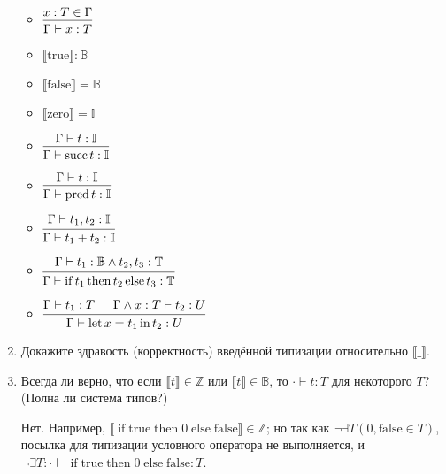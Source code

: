 \documentclass{article}
\DeclareMathOperator{\tsucc}{succ}
\DeclareMathOperator{\tpred}{pred}
\DeclareMathOperator{\tlet}{let}
\DeclareMathOperator{\tin}{in}
\DeclareMathOperator{\tthen}{then}
\DeclareMathOperator{\telse}{else}
\DeclareMathOperator{\tif}{if}
\begin{document}
\begin{enumerate}
        \begin{itemize}
            \item $
                \begin{prooftree}
                    \hypo{x:T\in\Gamma}
                    \infer 1{\Gamma\vdash x:T}
                \end{prooftree}
            $
            \item $\llbracket\mathrm{true}\rrbracket : \mathbb{B}$
            \item $\llbracket\mathrm{false}\rrbracket = \mathbb{B}$
            \item $\llbracket\mathrm{zero}\rrbracket = \mathbb{I}$    
            \item $
                \begin{prooftree}
                    \hypo{\Gamma\vdash t:\mathbb{I}}
                    \infer 1{\Gamma\vdash \tsucc t:\mathbb{I}}
                \end{prooftree}
            $
            \item $
                \begin{prooftree}
                    \hypo{\Gamma\vdash t:\mathbb{I}}
                    \infer 1{\Gamma\vdash \tpred t:\mathbb{I}}
                \end{prooftree}
            $
            \item $
                \begin{prooftree}
                    \hypo{\Gamma\vdash t_1,t_2:\mathbb{I}}
                    \infer 1{\Gamma\vdash t_1 + t_2:\mathbb{I}}
                \end{prooftree}
            $
            \item $
                \begin{prooftree}
                    \hypo{\Gamma\vdash t_1:\mathbb{B}\land t_2,t_3:\mathbb{T}}
                    \infer 1{\Gamma\vdash \tif t_1 \tthen t_2 \telse t_3:\mathbb{T}}
                \end{prooftree}
            $
            \item $
                \begin{prooftree}
                    \hypo{\Gamma\vdash t_1: T}
                    \hypo{\Gamma\land x: T \vdash t_2 : U}
                    \infer 2{\Gamma\vdash \tlet x = t_1 \tin t_2: U}
                \end{prooftree}
            $
        \end{itemize}

    \item Докажите здравость (корректность) введённой типизации относительно $\llbracket\_\rrbracket$.
    \item Всегда ли верно, что если $\llbracket t\rrbracket \in \mathbb{Z}$ или $\llbracket t\rrbracket \in \mathbb{B}$, то $\cdot\vdash t:T$ для некоторого $T$? (Полна ли система типов?)
    
        Нет. Например, $\llbracket \tif \mathrm{true} \tthen 0 \telse \mathrm{false} \rrbracket \in \mathbb{Z}$; но так как $\neg\exists T(0,\mathrm{false}\in T)$, посылка для типизации условного оператора не выполняется, и $\neg\exists T: \cdot\vdash \tif \mathrm{true} \tthen 0 \telse \mathrm{false} : T$.
\end{enumerate}
\end{document}
